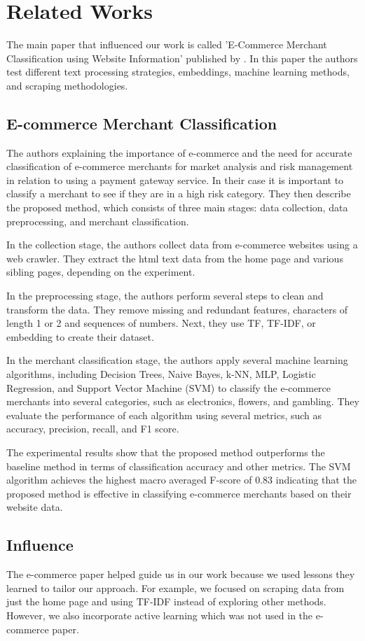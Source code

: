 \chapter{Related Works}

The main paper that influenced our work is called 'E-Commerce Merchant Classification using Website Information' published by \cite{sahid2019ecommerce}. In this paper the authors test different text processing strategies, embeddings, machine learning methods, and scraping methodologies. 

\section{E-commerce Merchant Classification}

The authors explaining the importance of e-commerce and the need for accurate classification of e-commerce merchants for market analysis and risk management in relation to using a payment gateway service. In their case it is important to classify a merchant to see if they are in a high risk category. They then describe the proposed method, which consists of three main stages: data collection, data preprocessing, and merchant classification.

In the collection stage, the authors collect data from e-commerce websites using a web crawler. They extract the html text data from the home page and various sibling pages, depending on the experiment.

In the preprocessing stage, the authors perform several steps to clean and transform the data. They remove missing and redundant features, characters of length 1 or 2 and sequences of numbers. Next, they use TF, TF-IDF, or embedding to create their dataset.

In the merchant classification stage, the authors apply several machine learning algorithms, including Decision Trees, Naive Bayes, k-NN, MLP, Logistic Regression, and Support Vector Machine (SVM) to classify the e-commerce merchants into several categories, such as electronics, flowers, and gambling. They evaluate the performance of each algorithm using several metrics, such as accuracy, precision, recall, and F1 score.

The experimental results show that the proposed method outperforms the baseline method in terms of classification accuracy and other metrics. The SVM algorithm achieves the highest macro averaged F-score of 0.83 indicating that the proposed method is effective in classifying e-commerce merchants based on their website data.

\section{Influence}

The e-commerce paper helped guide us in our work because we used lessons they learned to tailor our approach. For example, we focused on scraping data from just the home page and using TF-IDF instead of exploring other methods. However, we also incorporate active learning which was not used in the e-commerce paper.